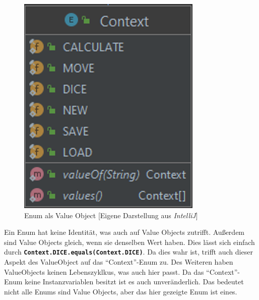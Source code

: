 \begin{figure}[htbp]
\centering
\centerline{\includegraphics[scale=.6]{valueobjects}}
\caption{Enum als Value Object [Eigene Darstellung aus \emph{IntelliJ}]}
\label{fig:valueobjects}
\end{figure}

\noindent Ein Enum hat keine Identität, was auch auf Value Objects zutrifft. Außerdem sind Value Objects gleich, wenn sie denselben Wert haben. Dies lässt sich einfach durch \textbf{\texttt{Context.DICE.equals(Context.DICE)}}. Da dies wahr ist, trifft auch dieser Aspekt des ValueObject auf das \enquote{Context}-Enum zu. Des Weiteren haben ValueObjects keinen Lebenszyklkus, was auch hier passt. Da das \enquote{Context}-Enum keine Instanzvariablen besitzt ist es auch unveränderlich. Das bedeutet nicht alle Enums sind Value Objects, aber das hier gezeigte Enum ist eines.



